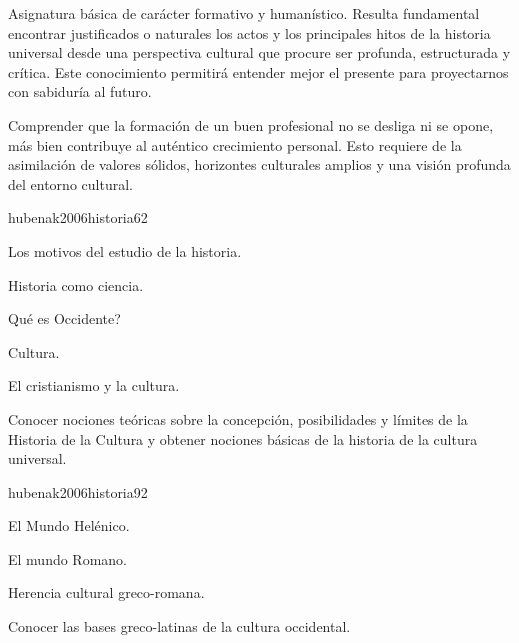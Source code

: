 \begin{syllabus}


\begin{justification}
Asignatura básica de carácter formativo y humanístico. Resulta fundamental encontrar justificados o naturales los actos y los principales hitos de la historia universal desde una perspectiva cultural que procure ser profunda, estructurada y crítica. Este conocimiento permitirá entender mejor el presente para proyectarnos con sabiduría al futuro.
\end{justification}

\begin{goals}
\item Comprender que la formación de un buen profesional no se desliga ni se opone, más bien contribuye al auténtico crecimiento personal. Esto requiere de la asimilación de valores sólidos, horizontes culturales amplios y una visión profunda del entorno cultural.
\end{goals}

\begin{outcomes}
\end{outcomes}

\begin{unit}{}{hubenak2006historia}{6}{2}
\begin{topics}
	\item Los motivos del estudio de la historia. 	
	\item Historia como ciencia. 	
	\item Qué es Occidente? 	
	\item Cultura. 	
	\item El cristianismo y la cultura. 
\end{topics}
\begin{unitgoals}
	\item Conocer nociones teóricas sobre la concepción, posibilidades y límites de la Historia de la Cultura y obtener nociones básicas de la historia de la cultura universal.
\end{unitgoals}
\end{unit}

\begin{unit}{}{hubenak2006historia}{9}{2}
\begin{topics}
	\item El Mundo Helénico. 	
	\item El mundo Romano. 	
	\item Herencia cultural greco-romana. 
\end{topics}
\begin{unitgoals}
	\item Conocer las bases greco-latinas de la cultura occidental.
\end{unitgoals}
\end{unit}


\end{syllabus}
